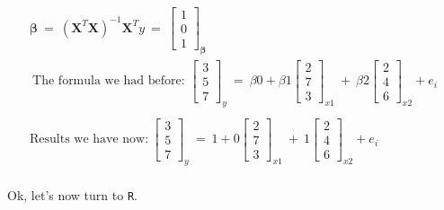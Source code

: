 \documentclass[10pt]{article}
\begin{document}
\begin{gather*}
\boldsymbol{\beta} \ =\ \left( \boldsymbol{X}^{T} \boldsymbol{X}\right)^{-1} \boldsymbol{X}^{T} y\ =\ \begin{bmatrix}
1\\
0\\
1
\end{bmatrix}_{\boldsymbol{\beta}}\\
\ \text{The formula we had before: }\begin{bmatrix}
3\\
5\\
7
\end{bmatrix}_{y} \ =\ \beta 0+\beta 1\begin{bmatrix}
2\\
7\\
3
\end{bmatrix}_{x1} \ +\ \beta 2\begin{bmatrix}
2\\
4\\
6
\end{bmatrix}_{x2} +e_{i}\\
\\
\text{Results we have now:} \ \begin{bmatrix}
3\\
5\\
7
\end{bmatrix}_{y} \ =\ 1+0\begin{bmatrix}
2\\
7\\
3
\end{bmatrix}_{x1} \ +\ 1\begin{bmatrix}
2\\
4\\
6
\end{bmatrix}_{x2} +e_{i}\\
\end{gather*}

Ok, let's now turn to \texttt{R}.
\end{document}
